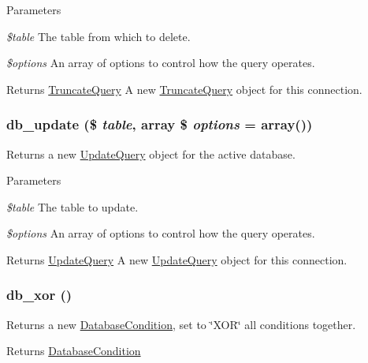 \begin{DoxyParams}{Parameters}
\item[{\em \$table}]The table from which to delete. \item[{\em \$options}]An array of options to control how the query operates.\end{DoxyParams}
\begin{DoxyReturn}{Returns}
\hyperlink{classTruncateQuery}{TruncateQuery} A new \hyperlink{classTruncateQuery}{TruncateQuery} object for this connection. 
\end{DoxyReturn}
\hypertarget{group__database_ga40967197ee5d6a23a5c5a77e627067fe}{
\subsubsection[{db\_\-update}]{\setlength{\rightskip}{0pt plus 5cm}db\_\-update (\$ {\em table}, \/  array \$ {\em options} = {\ttfamily array()})}}
\label{group__database_ga40967197ee5d6a23a5c5a77e627067fe}
Returns a new \hyperlink{classUpdateQuery}{UpdateQuery} object for the active database.


\begin{DoxyParams}{Parameters}
\item[{\em \$table}]The table to update. \item[{\em \$options}]An array of options to control how the query operates.\end{DoxyParams}
\begin{DoxyReturn}{Returns}
\hyperlink{classUpdateQuery}{UpdateQuery} A new \hyperlink{classUpdateQuery}{UpdateQuery} object for this connection. 
\end{DoxyReturn}
\hypertarget{group__database_ga85bb17ee005f930dd2caa93f0752d0e8}{
\subsubsection[{db\_\-xor}]{\setlength{\rightskip}{0pt plus 5cm}db\_\-xor ()}}
\label{group__database_ga85bb17ee005f930dd2caa93f0752d0e8}
Returns a new \hyperlink{classDatabaseCondition}{DatabaseCondition}, set to \char`\"{}XOR\char`\"{} all conditions together.

\begin{DoxyReturn}{Returns}
\hyperlink{classDatabaseCondition}{DatabaseCondition} 
\end{DoxyReturn}
